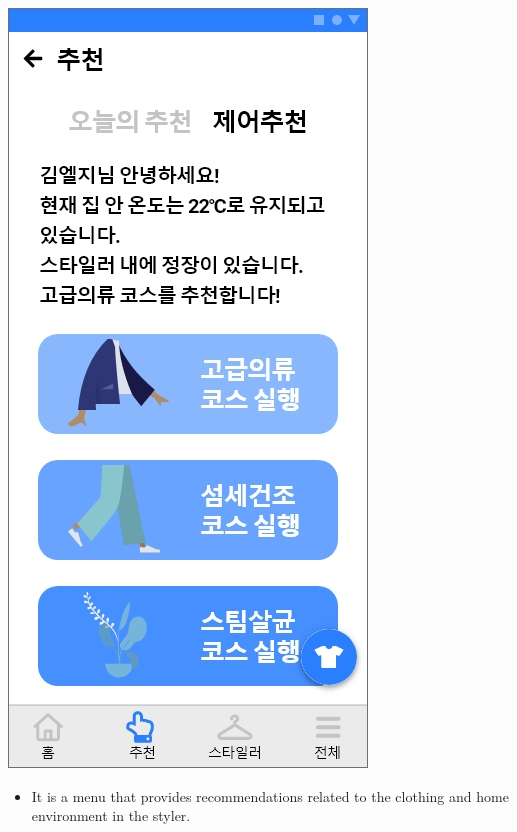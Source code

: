 \documentclass[conference]{IEEEtran}
\begin{document}
\begin{enumerate}
       \centerline{\includegraphics[scale=0.32]{assets/추천3.jpg}}
        \begin{itemize}
            \item[] It is a menu that provides recommendations related to the clothing and home environment in the styler.\\\\\\
        \end{itemize}
    
    \break
    

\end{enumerate}
\end{document}
